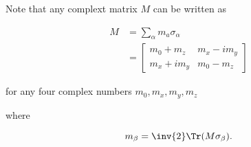 Note that any complext matrix $M$ can be written as

\begin{align*}
M &= \sum_\alpha m_a \sigma_\alpha \\
  &=
\begin{bmatrix}
m_0 + m_z & m_x - i m_y \\
m_x + i m_y & m_0 - m_z
\end{bmatrix}
\end{align*}

for any four complex numbers $m_0, m_x, m_y, m_z$

where

\begin{equation}\label{eqn:qmTwoL14:n}
m_\beta = \inv{2} \Tr(M \sigma_\beta).
\end{equation}

\EndArticle
